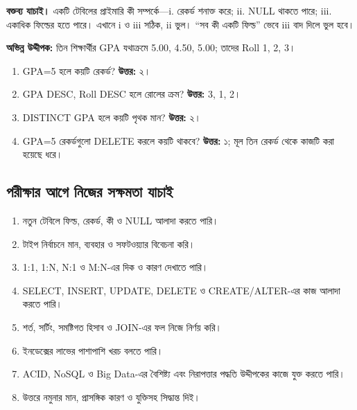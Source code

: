 \noindent\textbf{বক্তব্য যাচাই।} একটি টেবিলের প্রাইমারি কী সম্পর্কে---i. রেকর্ড শনাক্ত করে; ii. NULL থাকতে পারে; iii. একাধিক ফিল্ডের হতে পারে। এখানে i ও iii সঠিক, ii ভুল। “সব কী একটি ফিল্ড” ভেবে iii বাদ দিলে ভুল হবে।

\textbf{অভিন্ন উদ্দীপক:} তিন শিক্ষার্থীর GPA যথাক্রমে 5.00, 4.50, 5.00; তাদের Roll 1, 2, 3।
\begin{enumerate}
\item GPA=5 হলে কয়টি রেকর্ড? \textbf{উত্তর:} ২।
\item GPA DESC, Roll DESC হলে রোলের ক্রম? \textbf{উত্তর:} 3, 1, 2।
\item DISTINCT GPA হলে কয়টি পৃথক মান? \textbf{উত্তর:} ২।
\item GPA=5 রেকর্ডগুলো DELETE করলে কয়টি থাকবে? \textbf{উত্তর:} ১; মূল তিন রেকর্ড থেকে কাজটি করা হয়েছে ধরে।
\end{enumerate}

\subsection{পরীক্ষার আগে নিজের সক্ষমতা যাচাই}
\begin{enumerate}
\item নতুন টেবিলে ফিল্ড, রেকর্ড, কী ও NULL আলাদা করতে পারি।
\item টাইপ নির্বাচনে মান, ব্যবহার ও সফটওয়্যার বিবেচনা করি।
\item 1:1, 1:N, N:1 ও M:N-এর দিক ও কারণ দেখাতে পারি।
\item SELECT, INSERT, UPDATE, DELETE ও CREATE/ALTER-এর কাজ আলাদা করতে পারি।
\item শর্ত, সর্টিং, সমষ্টিগত হিসাব ও JOIN-এর ফল নিজে নির্ণয় করি।
\item ইনডেক্সের লাভের পাশাপাশি খরচ বলতে পারি।
\item ACID, NoSQL ও Big Data-এর বৈশিষ্ট্য এবং নিরাপত্তার পদ্ধতি উদ্দীপকের কাজে যুক্ত করতে পারি।
\item উত্তরে নমুনার মান, প্রাসঙ্গিক কারণ ও যুক্তিসহ সিদ্ধান্ত দিই।
\end{enumerate}
